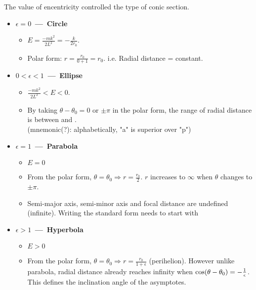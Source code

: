 \documentclass[class=article, crop=false, 12pt]{standalone}
\begin{document}
The value of encentricity controlled the type of conic section. 

\begin{itemize}
    \item \textbf{$\epsilon = 0$ \,---\, Circle}
    \begin{itemize}
        \item $E = \frac{-mk^2}{2L^2} = -\frac{k}{2r_0}$.
        \item Polar form: $r=\frac{r_0}{0+1} = r_0$. i.e. Radial distance = constant.
    \end{itemize}
    \item \textbf{$0<\epsilon<1 $ \,---\, Ellipse}
    \begin{itemize}
        \item $ \frac{-mk^2}{2L^2} < E < 0$.
        \item By taking $\theta-\theta_0 = 0$ or $\pm\pi$ in the polar form, the range of radial distance is between  and . \\
        (mnemonic(?): alphabetically, "a" is superior over "p")



    \end{itemize}
    \item \textbf{$\epsilon=1$ \,---\, Parabola}
    \begin{itemize}
        \item $E=0$
        \item From the polar form, $\theta=\theta_0 \Rightarrow r=\frac{r_0}{2}$. $r$ increases to $\infty$ when $\theta$ changes to $\pm \pi$.
        \item Semi-major axis, semi-minor axis and focal distance are undefined (infinite). 
        Writing the standard form needs to start with



    \end{itemize}
    \item \textbf{$\epsilon>1$ \,---\, Hyperbola}
    \begin{itemize}
        \item $E>0$
        \item From the polar form, $\theta=\theta_0 \Rightarrow r=\frac{r_0}{1+\epsilon}$ (perihelion). 
        However unlike parabola, radial distance already reaches infinity when $\cos(\theta-\theta_0)=-\frac{1}{\epsilon}$.
        This defines the inclination angle of the asymptotes.


\end{itemize}
\end{itemize}
\end{document}
